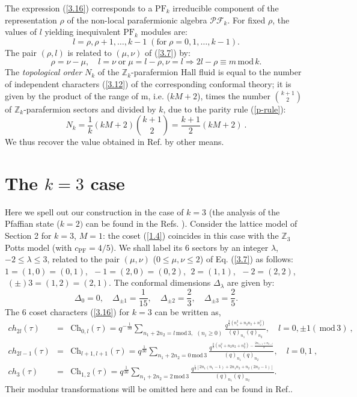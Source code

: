 \documentclass[a4paper,12pt]{article}
\newcommand{\clth}{\setcounter{thm}{0}}
\newcommand{\sectionnew}[1]{\section{#1}\clth}
\newcommand{\beq}{\begin{equation}}
\newcommand{\eeq}{\end{equation}}
\newcommand{\beqa}{\begin{eqnarray}}
\newcommand{\eeqa}{\end{eqnarray}}
\newcommand{\nn}{\nonumber \\}
\def \r {\rho}
\def \D {\Delta}
\def \t {\tau}
\def \Z {{\mathbb Z}}
\def \mod {\, \mathrm{mod}\, }
\def \PF {\mathrm{PF}}
\def \ch {\mathrm{Ch} }
\def \PFC {${\mathcal{P}\mathcal{F}_k}$}
\begin{document}
The expression (\ref{3.16}) corresponds to a $\PF_k$ irreducible
component of the representation $\r$ of the non-local parafermionic
algebra \PFC. For fixed $\r$,
the values of $l$ yielding inequivalent $\PF_k$ modules are:
\beq\label{3.21}
l = \r, \r +1,\ldots,k-1 \; (\mathrm{for} \; \r =0,1, \ldots, k-1).
\eeq
The pair $(\r,l)$ is related to $(\mu,\nu)$ of (\ref{3.7}) by:
\beq\label{3.22}
\r = \nu - \mu , \quad l=\nu  \; \mathrm{or} \; \mu = l-\r, \nu =l
\Rightarrow 2l-\r \equiv m \mod  k.
\eeq
The {\it topological order} $N_k$  of 
the $\Z_k$-parafermion Hall fluid
is equal \cite{cz} to the number of independent characters (\ref{3.12})
of the corresponding conformal theory; 
it is given by the product of the range of m, i.e. ($kM + 2$), 
times the number ${ k+1 \choose 2}$ of $\Z_k$-parafermion
sectors and divided by $k$, due to the parity rule (\ref{p-rule}):
\beq\label{3.23}
N_k = \frac{1}{k}(kM + 2) { k +1 \choose 2} = \frac{k+1}{2}(kM + 2 ) \ .
\eeq
We thus recover the value obtained in Ref.\cite{rr} by other means.



\sectionnew{The $k=3$ case}

Here we spell out our construction in the case of $k=3$
(the analysis of the Pfaffian state ($k=2)$ can be found in the 
Refs.\cite{cgt} \cite{cgt2}).
Consider the lattice model of Section 2 for
$k=3$, $M=1$: the  coset (\ref{1.4}) coincides in this case with
the $\Z_3$ Potts model (with $c_\PF=4/5$). We shall label its 6 sectors
by an integer $\lambda$,  $-2 \leq \lambda \leq 3$,  related to the pair
$(\mu,\nu)$  ($0\leq \mu,\nu \leq 2$) of Eq. (\ref{3.7}) as follows:
$1=(1,0)=(0,1)$, $ \; -1=(2,0)=(0,2)$, $\; 2=(1,1)$, $\; -2=(2,2)$,
$\; (\pm) 3=(1,2)=(2,1)$. 
The conformal dimensions $\D_\lambda$ are given by:
\beq\label{3.5'}
\D_0=0, \quad \D_{\pm 1}=\frac{1}{15}, \quad \D_{\pm 2}=\frac{2}{3},
\quad  \D_{\pm 3}=\frac{2}{5}.
\eeq
The 6 coset characters (\ref{3.16}) for $k=3$ can be written as,
\beqa\label{4.9}
\!\!\!\!\! ch_{2l}(\t)&=&\ch_{0,l}(\t) = q^{-\frac{1}{30}}
\sum_{n_1+2n_2=l \mod 3,\ \ (n_i\geq 0)}
\frac{q^{\frac{2}{3}\left(n_1^2+n_2n_2+n_2^2 \right)}}{(q)_{n_1}(q)_{n_2}},
\quad l=0,\pm 1 (\mod 3) \ ,\nn
\!\!\!\!\! ch_{2l-1}(\t)&=& \ch_{l+1,l+1}(\t) = 
q^{\frac{1}{30}} \sum_{n_1+2n_2=0 \mod 3}
\frac{q^{\frac{2}{3}\left(n_1^2+n_2n_2+n_2^2 \right) - 
\frac{2n_{l+1}+n_{2-l}}{3}}}{(q)_{n_1}(q)_{n_2}}, \quad l=0, 1\ , \nn
\!\!\!\!\! ch_{3}(\t)&=&\ch_{1,2}(\t) = 
q^{\frac{1}{30}} \sum_{n_1+2n_2=2 \mod 3}
\frac{q^{\frac{1}{3}\left[2n_1(n_1-1)+2 n_1 n_2 + n_2(2n_2-1) \right]}}
{(q)_{n_1}(q)_{n_2}}.
\eeqa
Their modular transformations will be omitted here and can be found
in Ref.\cite{cgt2}.
 
\end{document}
